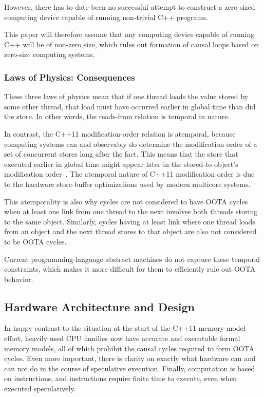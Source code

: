 \documentclass[10]{article}
\begin{document}
However, there has to date been no successful attempt to construct a
zero-sized computing device capable of running non-trivial C++ programs.

This paper will therefore assume that any computing device capable of
running C++ will be of non-zero size, which rules out formation of
causal loops based on zero-size computing systems.

\subsubsection{Laws of Physics: Consequences}
\label{sec:Laws of Physics: Consequences}

These three laws of physics mean that if one thread loads the value
stored by some other thread, that load must have occurred earlier
in global time than did the store.
In other words, the reads-from relation is temporal in nature.

In contrast, the C++11 modification-order relation is atemporal,
because computing systems can and observably do determine the
modification order of a set of concurrent stores long after the fact.
This means that the store that executed earlier in global time
might appear later in the stored-to object's modification
order~\cite{McKenney20xxParallelProgramming}.
The atemporal nature of C++11 modification order is due to the hardware
store-buffer optimizations used by modern multicore systems.

This atemporality is also why cycles are not considered to have
OOTA cycles when at least one link from one thread to the next
involves both threads storing to the same object.
Similarly, cycles having at least link where one thread loads from an
object and the next thread stores to that object are also not considered
to be OOTA cycles.

Current programming-language abstract machines do not capture these
temporal constraints, which makes it more difficult for them to
efficiently rule out OOTA behavior.

\subsection{Hardware Architecture and Design}
\label{sec:Hardware Architecture and Design}

In happy contrast to the situation at the start of the C++11 memory-model
effort, heavily used CPU families now have accurate and executable formal
memory models, all of which prohibit the causal cycles required to form
OOTA cycles.
Even more important, there is clarity on exactly what hardware can and
can not do in the course of speculative execution.
Finally, computation is based on instructions, and instructions require
finite time to execute, even when executed speculatively.
\end{document}
